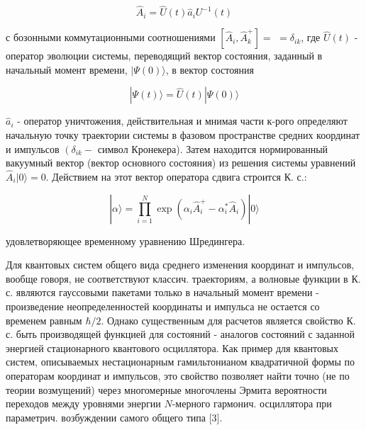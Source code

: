 \documentclass[10pt]{article}
\begin{document}
\[

\hat{A}_{i}=\hat{U}(t) \hat{a}_{i} U^{-1}(t)

\]



с бозонными коммутационными соотношениями $\left[\hat{A}_{i}, \hat{A}_{k}^{+}\right]=$ $=\delta_{i k}$, где $\hat{U}(t)$ - оператор эволюции системы, переводящий вектор состояния, заданный в начальный момент времени, $|\Psi(0)\rangle$, в вектор состояния



\[

|\Psi(t)\rangle=\hat{U}(t)|\Psi(0)\rangle

\]



$\hat{a}_{i}$ - оператор уничтожения, действительная и мнимая части к-рого определяют начальную точку траектории системы в фазовом пространстве средних координат и импульсов $\left(\delta_{i k}-\right.$ символ Кронекера). Затем находится нормированный вакуумный вектор (вектор основного состояния) из решения системы уравнений $\hat{A}_{i}|0\rangle=0$. Действием на этот вектор оператора сдвига строится К. с.:



\[

|\alpha\rangle=\prod_{i=1}^{N} \exp \left(\alpha_{i} \hat{A}_{i}^{+}-\alpha_{i}^{*} \hat{A}_{i}\right)|0\rangle

\]



удовлетворяющее временному уравнению Шредингера.



Для квантовых систем общего вида среднего изменения координат и импульсов, вообще говоря, не соответствуют классич. траекториям, а волновые функции в К. с. являются гауссовыми пакетами только в начальный момент времени - произведение неопределенностей координаты и импульса не остается со временем равным $\hbar / 2$. Однако существенным для расчетов является свойство К. с. быть производящей функцией для состояний - аналогов состояний с заданной энергией стационарного квантового осциллятора. Как пример для квантовых систем, описываемых нестационарным гамильтонианом квадратичной формы по операторам координат и импульсов, это свойство позволяет найти точно (не по теории возмущений) через многомерные многочлены Эрмита вероятности переходов между уровнями энергии $N$-мерного гармонич. осциллятора при параметрич. возбуждении самого общего типа [3].
\end{document}
